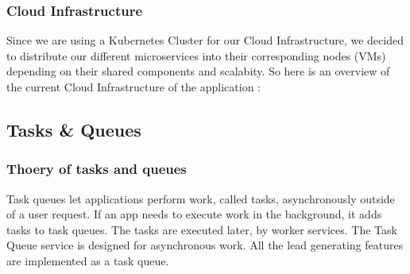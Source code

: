 \subsubsection{Cloud Infrastructure}
Since we are using a Kubernetes Cluster for our Cloud Infrastructure, we decided to distribute our different microservices into their corresponding nodes (VMs) depending on their shared components and scalabity. So here is an overview of the current Cloud Infrastructure of the application :
\linebreak
{}
\newpage
\subsection{Tasks \& Queues}
\subsubsection{Thoery of tasks and queues}
Task queues let applications perform work, called tasks, asynchronously outside of a user request. If an app needs to execute work in the background,
 it adds tasks to task queues. The tasks are executed later, by worker services. The Task Queue service is designed for asynchronous work.
\linebreak
All the lead generating features are implemented as a task queue.
\linebreak
\linebreak
{}
\newpage
